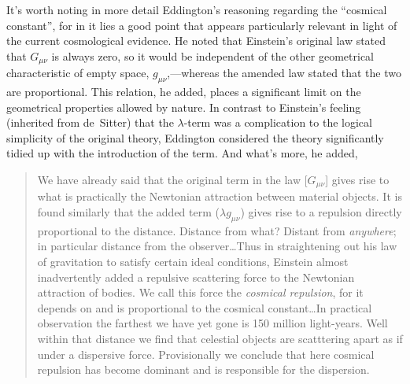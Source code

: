 \documentclass[12 pt]{article}
\begin{document}
It's worth noting in more detail Eddington's reasoning regarding the ``cosmical constant'', for in it lies a good point that appears particularly relevant in light of the current cosmological evidence. He noted \citep[p.~22]{Eddington1933} that Einstein's original law stated that $G_{\mu\nu}$ is always zero, so it would be independent of the other geometrical characteristic of empty space, $g_{\mu\nu}$,---whereas the amended law stated that the two are proportional. This relation, he added, places a significant limit on the geometrical properties allowed by nature. In contrast to Einstein's feeling (inherited from de~Sitter) that the $\lambda$-term was a complication to the logical simplicity of the original theory, Eddington considered the theory significantly tidied up with the introduction of the term. And what's more, he added,
\begin{quotation}
We have already said that the original term in the law [$G_{\mu\nu}$] gives rise to what is practically the Newtonian attraction between material objects. It is found similarly that the added term ($\lambda{g}_{\mu\nu}$) gives rise to a repulsion directly proportional to the distance. Distance from what? Distant from \textit{anywhere}; in particular distance from the observer\ldots Thus in straightening out his law of gravitation to satisfy certain ideal conditions, Einstein almost inadvertently added a repulsive scattering force to the Newtonian attraction of bodies. We call this force the \textit{cosmical repulsion}, for it depends on and is proportional to the cosmical constant\ldots In practical observation the farthest we have yet gone is 150 million light-years. Well within that distance we find that celestial objects are scatttering apart as if under a dispersive force. Provisionally we conclude that here cosmical repulsion has become dominant and is responsible for the dispersion.
\end{quotation}
\end{document}
